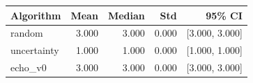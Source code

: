 \begin{tabular}{lrrrr}
\hline
Algorithm & Mean & Median & Std & 95\% CI \\
\hline
random & 3.000 & 3.000 & 0.000 & [3.000, 3.000] \\
uncertainty & 1.000 & 1.000 & 0.000 & [1.000, 1.000] \\
echo\_v0 & 3.000 & 3.000 & 0.000 & [3.000, 3.000] \\
\hline
\end{tabular}
